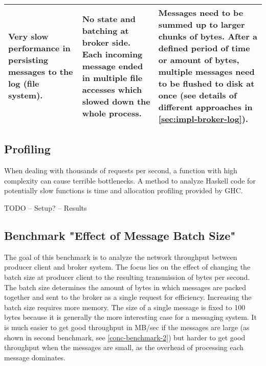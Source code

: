 \begin{table}[H]
\begin{tabular}{|p{4cm}|p{5cm}|p{6cm}|}
Very slow performance in persisting messages to the log (file system).                                 & No state and batching at broker side. Each incoming message ended in multiple file accesses which slowed down the whole process.                                                                                                                                & Messages need to be summed up to larger chunks of bytes. After a defined period of time or amount of bytes, multiple messages need to be flushed to disk at once (see details of different approaches in \ref{sec:impl-broker-log}).                                                                                                                                      \\ \hline
\end{tabular}
\end{table}


\subsection{Profiling}
When dealing with thousands of requests per second, a function with high complexity
can cause terrible bottlenecks. A method to analyze Haskell code for
potentially slow functions is time and allocation profiling provided by GHC.

TODO
-- Setup?
-- Results 

\subsection{Benchmark "Effect of Message Batch Size"}
\label{sec:conc-benchmark-1}

The goal of this benchmark is to analyze the network throughput between producer
client and broker system.  The focus lies on the effect of changing the batch
size at producer client to the resulting transmission of bytes per second. The
batch size determines the amount of bytes in which messages are packed
together and sent to the broker as a single request for efficiency. Increasing the
batch size requires more memory. The size of a single message is fixed to 100
bytes because it is generally the more interesting case for a messaging system. It is much easier to get good throughput in MB/sec if the messages are
large (as shown in second benchmark, see \ref{conc-benchmark-2}) but
harder to get good throughput when the messages are small, as the overhead of
processing each message dominates.

